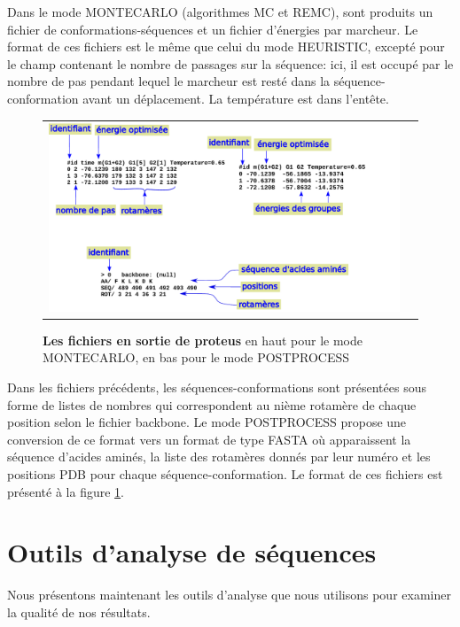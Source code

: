 Dans le mode MONTECARLO (algorithmes MC et REMC), sont produits un fichier de conformations-séquences et un fichier d'énergies par marcheur. Le format de ces fichiers est le même que celui du mode HEURISTIC, excepté pour le champ contenant le nombre de passages sur la séquence: ici, il est occupé par le nombre de pas pendant lequel le marcheur est resté dans la séquence-conformation avant un déplacement. La température est dans l'entête.

   \begin{figure}[!htbp]
     \centering 
     \begin{tabular}{cc}
       \includegraphics[width=18cm]{figure/output.pdf} &
     \end{tabular}
     
     \caption{\textbf{Les fichiers en sortie de proteus} en haut pour le mode MONTECARLO, en bas pour le mode POSTPROCESS}
\label{proteusoutput}
   \end{figure}

Dans les fichiers précédents, les séquences-conformations sont présentées sous forme de listes de nombres qui correspondent au nième rotamère de chaque position selon le fichier backbone. Le mode POSTPROCESS propose une conversion de ce format vers un format de type FASTA où apparaissent la séquence d'acides aminés, la liste des rotamères donnés par leur numéro et les positions PDB pour chaque séquence-conformation. Le format de ces fichiers est présenté à la figure \ref{proteusoutput}.

\section{Outils d'analyse de séquences}

Nous présentons maintenant les outils d'analyse que nous utilisons pour examiner la qualité de nos résultats.
